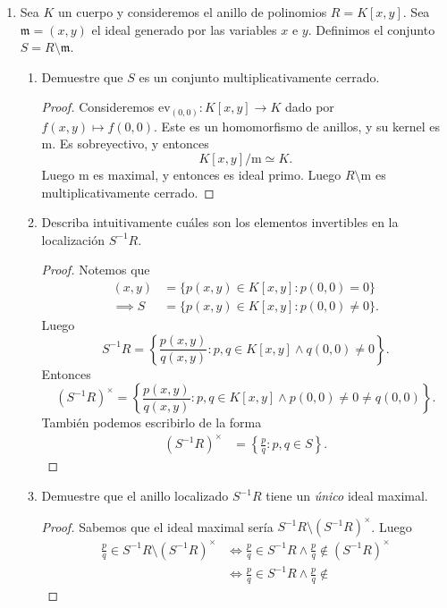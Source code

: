 \documentclass{article}
\theoremstyle{definition}
\theoremstyle{remark}
\numberwithin{equation}{section}
\newcommand{\set}[1]{\left\{ #1 \right\}}
\begin{document}
\begin{enumerate}
    \item  Sea $K$ un cuerpo y consideremos el anillo de polinomios $R = K[x,y]$. Sea $\mathfrak{m} = (x,y)$ el ideal generado por las variables $x$ e $y$. Definimos el conjunto $S = R \setminus \mathfrak{m}$.

\begin{enumerate}
    \item Demuestre que $S$ es un conjunto multiplicativamente cerrado.
    \begin{proof}
      Consideremos $\mathrm{ev}_{(0,0)} \colon K[x,y] \to K$ dado por $f(x,y) \mapsto f(0,0)$. Este es un homomorfismo de anillos, y su kernel es $\mathrm m$. Es sobreyectivo, y entonces 
      \[ K[x,y]/{\mathrm{m}} \simeq K. \]
      Luego $\mathrm{m}$ es maximal, y entonces es ideal primo. Luego $R \setminus \mathrm{m}$ es multiplicativamente cerrado.
    \end{proof}
    \item Describa intuitivamente cuáles son los elementos invertibles en la localización $S^{-1}R$.
    \begin{proof}
      Notemos que 
      \begin{align*}
          (x,y) &= \{p(x,y) \in K[x,y] \colon p(0,0) = 0\} \\
          \implies S &= \{p(x,y) \in K[x,y] \colon p(0,0) \neq 0\}.
      \end{align*}
      Luego 
      \[ S^{-1}R = \set{\frac{p(x,y)}{q(x,y)} \colon p,q \in K[x,y] \land q(0,0) \neq 0}. \]
      Entonces 
      \[ (S^{-1}R)^\times = \set{\frac{p(x,y)}{q(x,y)} \colon p,q \in K[x,y] \land p(0,0) \neq 0 \neq q(0,0)}. \]
      También podemos escribirlo de la forma 
      \begin{align*}
          (S^{-1}R)^\times &= \set{\frac{p}{q} \colon p,q \in S}.
      \end{align*}
    \end{proof}
    \item Demuestre que el anillo localizado $S^{-1}R$ tiene un \textit{único} ideal maximal.
    \begin{proof}
      Sabemos que el ideal maximal sería $S^{-1}R \setminus (S^{-1}R)^\times$. Luego 
      \begin{align*}
          \frac{p}{q} \in S^{-1} R \setminus (S^{-1} R)^\times
          &\iff \frac{p}{q} \in S^{-1} R \land \frac{p}{q} \notin (S^{-1}R)^\times \\
          &\iff \frac{p}{q} \in S^{-1} R \land \frac{p}{q} \notin 
      \end{align*}
      

\end{proof}
\end{enumerate}
\end{enumerate}
\end{document}
